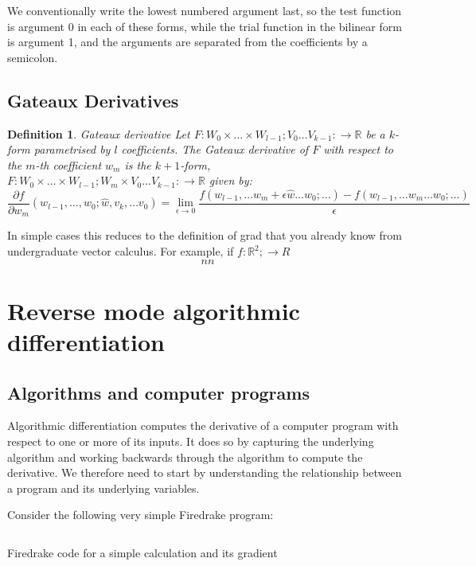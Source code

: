 \documentclass[a4paper,12pt]{report}
\newtheorem{definition}[chapter]{Definition}
\begin{document}
We conventionally write the lowest numbered argument last, so the test function
is argument 0 in each of these forms, while the trial function in the bilinear
form is argument 1, and the arguments are separated from the coefficients by a
semicolon.

\section{Gateaux Derivatives}

\begin{definition}{Gateaux derivative}
    Let $F: W_0\times \ldots \times W_{l-1}; V_0\ldots
    V_{k-1}:\rightarrow\mathbb{R}$ be a $k$-form parametrised by $l$
    coefficients. The \emph{Gateaux derivative} of $F$ with respect to the
    $m$-th coefficient $w_m$ is the $k+1$-form, $F: W_0\times \ldots \times
    W_{l-1}; W_m \times V_0\ldots V_{k-1}:\rightarrow\mathbb{R}$ given by:
    \[
        \frac{\partial f}{\partial w_m}(w_{l-1},\ldots,w_{0}; \hat{w}, v_k, \ldots v_0)
        = \lim_{\epsilon\rightarrow 0} \frac{
            f(w_{l-1},\ldots w_m + \epsilon \hat{w} \ldots w_0; \ldots)
            - f(w_{l-1},\ldots w_m \ldots w_0; \ldots)
        }{\epsilon}
    \]
\end{definition}

In simple cases this reduces to the definition of grad that you already know
from undergraduate vector calculus. For example, if $f: \mathbb{R}^2;\rightarrow R$
\begin{equation}
    nn
\end{equation}

\chapter{Reverse mode algorithmic differentiation}


\section{Algorithms and computer programs}

Algorithmic differentiation computes the derivative of a computer program with
respect to one or more of its inputs. It does so by capturing the underlying
algorithm and working backwards through the algorithm to compute the
derivative. We therefore need to start by understanding the relationship
between a program and its underlying variables.

Consider the following very simple Firedrake program:
\begin{listing}
    \inputminted[linenos]{python3}{examples/assembly.py}
    \caption{Firedrake code for a simple calculation and its gradient}
    \label{lst:assembly_code}
\end{listing}
\end{document}
